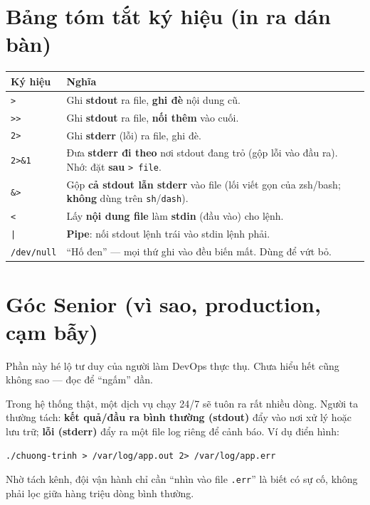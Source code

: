 \documentclass[12pt,a4paper]{article}
\newcommand{\cmd}[1]{\texttt{#1}}
\begin{document}
\section{Bảng tóm tắt ký hiệu (in ra dán bàn)}

\begin{center}
\renewcommand{\arraystretch}{1.3}
\begin{tabular}{>{\raggedright\arraybackslash}p{2.6cm} >{\raggedright\arraybackslash}p{9.6cm}}
\rowcolor{seniorbluebg}
\textbf{Ký hiệu} & \textbf{Nghĩa} \\
\hline
\cmd{>} & Ghi \textbf{stdout} ra file, \textbf{ghi đè} nội dung cũ. \\
\cmd{>>} & Ghi \textbf{stdout} ra file, \textbf{nối thêm} vào cuối. \\
\cmd{2>} & Ghi \textbf{stderr} (lỗi) ra file, ghi đè. \\
\cmd{2>\&1} & Đưa \textbf{stderr đi theo} nơi stdout đang trỏ (gộp lỗi vào đầu ra). Nhớ: đặt \textbf{sau} \cmd{> file}. \\
\cmd{\&>} & Gộp \textbf{cả stdout lẫn stderr} vào file (lối viết gọn của zsh/bash; \textbf{không} dùng trên \cmd{sh}/\cmd{dash}). \\
\cmd{<} & Lấy \textbf{nội dung file} làm \textbf{stdin} (đầu vào) cho lệnh. \\
\cmd{|} & \textbf{Pipe}: nối stdout lệnh trái vào stdin lệnh phải. \\
\cmd{/dev/null} & ``Hố đen'' --- mọi thứ ghi vào đều biến mất. Dùng để vứt bỏ. \\
\end{tabular}
\end{center}

\section{Góc Senior (vì sao, production, cạm bẫy)}

Phần này hé lộ tư duy của người làm DevOps thực thụ. Chưa hiểu hết cũng không sao --- đọc để ``ngấm'' dần.

\begin{seniorbox}[title={Góc Senior \#1 --- Tách stderr là xương sống của log và automation}]
Trong hệ thống thật, một dịch vụ chạy 24/7 sẽ tuôn ra rất nhiều dòng. Người ta thường tách: \textbf{kết quả/đầu ra bình thường (stdout)} đẩy vào nơi xử lý hoặc lưu trữ; \textbf{lỗi (stderr)} đẩy ra một file log riêng để cảnh báo. Ví dụ điển hình:
\begin{Verbatim}
./chuong-trinh > /var/log/app.out 2> /var/log/app.err
\end{Verbatim}
Nhờ tách kênh, đội vận hành chỉ cần ``nhìn vào file \cmd{.err}'' là biết có sự cố, không phải lọc giữa hàng triệu dòng bình thường.
\end{seniorbox}
\end{document}
